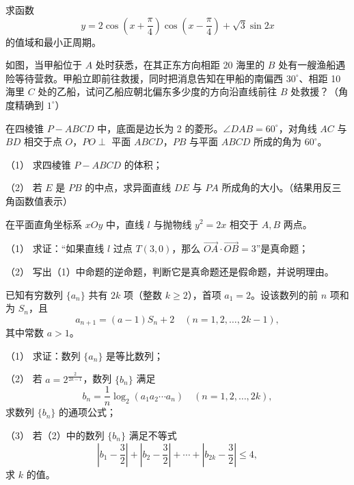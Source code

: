 \begin{question}
求函数
\nopagebreak[4]
\[
y=2\cos\left(x+\frac\pi4\right)\cos\left(x-\frac\pi4\right)+\sqrt3\sin2x
\]
的值域和最小正周期。

\Needspace{0.4\textheight}
\end{question}
\begin{question}
如图，当甲船位于 $A$ 处时获悉，在其正东方向相距 20 海里的 $B$ 处有一艘渔船遇险等待营救。甲船立即前往救援，同时把消息告知在甲船的南偏西 $30^\circ$、相距 10 海里 $C$ 处的乙船，试问乙船应朝北偏东多少度的方向沿直线前往 $B$ 处救援？（角度精确到 $1^\circ$）
\nopagebreak[4]
\begin{center}\end{center}
\nopagebreak[4]
\Needspace{0.4\textheight}
\end{question}
\begin{question}
在四棱锥 $P-ABCD$ 中，底面是边长为 2 的菱形。$\angle DAB=60^\circ$，对角线 $AC$ 与 $BD$ 相交于点 $O$，$PO\perp$ 平面 $ABCD$，$PB$ 与平面 $ABCD$ 所成的角为 $60^\circ$。

（1） 求四棱锥 $P-ABCD$ 的体积；

（2） 若 $E$ 是 $PB$ 的中点，求异面直线 $DE$ 与 $PA$ 所成角的大小。（结果用反三角函数值表示）
\nopagebreak[4]
\begin{center}\end{center}
\nopagebreak[4]
\end{question}
\begin{question}
在平面直角坐标系 $xOy$ 中，直线 $l$ 与抛物线 $y^2=2x$ 相交于 $A,B$ 两点。

（1） 求证：“如果直线 $l$ 过点 $T(3,0)$，那么 $\overrightarrow{OA}\cdot\overrightarrow{OB}=3$”是真命题；

（2） 写出（1）中命题的逆命题，判断它是真命题还是假命题，并说明理由。

\end{question}
\begin{question}
已知有穷数列 $\{a_n\}$ 共有 $2k$ 项（整数 $k\ge2$），首项 $a_1=2$。设该数列的前 $n$ 项和为 $S_n$，且
\nopagebreak[4]
\[
a_{n+1}=(a-1)S_n+2\quad(n=1,2,\ldots,2k-1),
\]
其中常数 $a>1$。

（1） 求证：数列 $\{a_n\}$ 是等比数列；

（2） 若 $a=2^{\frac{2}{2k-1}}$，数列 $\{b_n\}$ 满足
\nopagebreak[4]
\[
b_n=\frac1n\log_2(a_1a_2\cdots a_n)\quad(n=1,2,\ldots,2k),
\]
求数列 $\{b_n\}$ 的通项公式；

（3） 若（2）中的数列 $\{b_n\}$ 满足不等式
\nopagebreak[4]
\[
\left|b_1-\frac32\right|+\left|b_2-\frac32\right|+\cdots+
\left|b_{2k}-\frac32\right|\le4,
\]
求 $k$ 的值。

\end{question}
